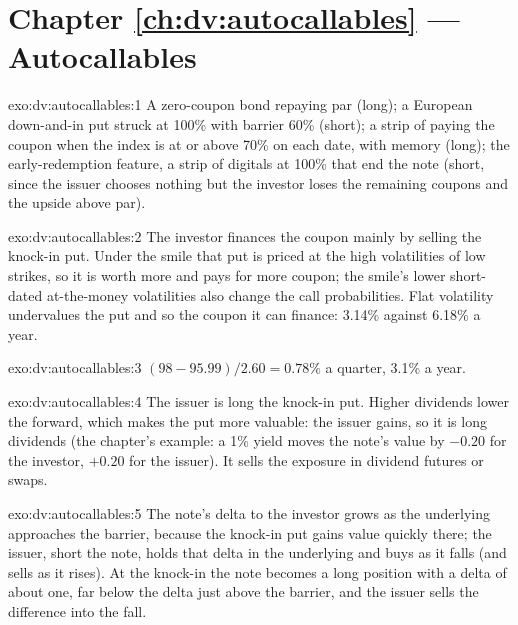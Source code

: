 \section*{Chapter \ref{ch:dv:autocallables} --- Autocallables}

\begin{solution}{exo:dv:autocallables:1}
A zero-coupon bond repaying par (long); a European down-and-in put struck at 100\% with barrier 60\% (short); a strip of  paying the coupon when the index is at or above 70\% on each date, with memory (long); the early-redemption feature, a
strip of digitals at 100\% that end the note (short, since the issuer chooses nothing but the investor loses the remaining
coupons and the upside above par).
\end{solution}

\begin{solution}{exo:dv:autocallables:2}
The investor finances the coupon mainly by selling the knock-in put. Under the smile that put is priced at the high volatilities of
low strikes, so it is worth more and pays for more coupon; the smile's lower short-dated at-the-money volatilities also change the
call probabilities. Flat volatility undervalues the put and so the coupon it can finance: 3.14\% against 6.18\% a year.
\end{solution}

\begin{solution}{exo:dv:autocallables:3}
$(98-95.99)/2.60=0.78\%$ a quarter, 3.1\% a year.
\end{solution}

\begin{solution}{exo:dv:autocallables:4}
The issuer is long the knock-in put. Higher dividends lower the forward, which makes the put more valuable: the issuer gains, so it is
long dividends (the chapter's example: a 1\% yield moves the note's value by $-0.20$ for the investor, $+0.20$ for the issuer). It sells
the exposure in dividend futures or swaps.
\end{solution}

\begin{solution}{exo:dv:autocallables:5}
The note's delta to the investor grows as the underlying approaches the barrier, because the knock-in put gains value quickly there;
the issuer, short the note, holds that delta in the underlying and buys as it falls (and sells as it rises). At the knock-in the note
becomes a long position with a delta of about one, far below the delta just above the barrier, and the issuer sells the difference
into the fall.
\end{solution}

